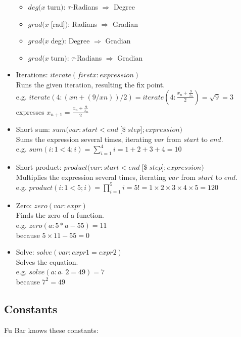 \documentclass[12pt,a4paper]{article}
\begin{document}
\begin{itemize}
\begin{itemize}
			  	\item $deg(x\;$turn$)$: $\tau$-Radians $\Rightarrow$ Degree
			  	\item $grad(x\;[$rad$])$: Radians $\Rightarrow$ Gradian
			  	\item $grad(x\;$deg$)$: Degree $\Rightarrow$ Gradian
			  	\item $grad(x\;$turn$)$: $\tau$-Radians $\Rightarrow$ Gradian
			  \end{itemize}
		\item Iterations: $iterate(firstx: expression)$\\
			  Runs the given iteration, resulting the fix point.\\
			  e.g. $iterate(4: (xn+(9/xn))/2) = iterate(4: \frac{x_n+{\frac{9}{x_n}}}{2}) = \sqrt{9} = 3$\\
			  expresses $x_{n+1} = \frac{x_n+{\frac{9}{x_n}}}{2}$
		\item Short sum: $sum(var: start < end \;[$\$$\; step]; expression)$\\
		      Sums the expression several times, iterating $var$ from $start$ to $end$.\\
		      e.g. $sum(i: 1 < 4; i) = \displaystyle\sum_{i=1}^{4} i = 1+2+3+4 = 10$
		\item Short product: $product(var: start < end \;[$\$$\; step]; expression)$\\
			  Multiplies the expression several times, iterating $var$ from $start$ to $end$.\\
			  e.g. $product(i: 1 < 5; i) = \displaystyle\prod_{i=1}^{5} i = 5! = 1\times2\times3\times4\times5 = 120$
		\item Zero: $zero(var: expr)$\\
			  Finds the zero of a function.\\
			  e.g. $zero(a: 5*a-55) = 11$\\
			  because $5\times11-55=0$
		\item Solve: $solve(var: expr1 = expr2)$\\
			  Solves the equation.\\
			  e.g. $solve(a: a\;\hat{}\;2=49) = 7$\\
			  because $7^2=49$
	\end{itemize}
	
	\subsection{Constants}
	
	Fu Bar knows these constants:
	
\end{document}
